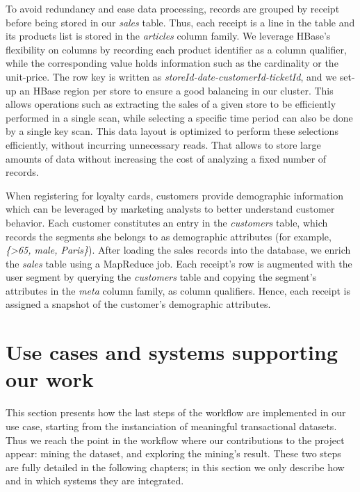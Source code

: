 To avoid redundancy and ease data processing,
records are grouped by receipt before being stored in our \textit{sales} table.
Thus, each receipt is a line in the table
and its products list is stored in the \textit{articles} column family.
We leverage HBase's flexibility on columns by recording each product identifier as a column qualifier,
while the corresponding value holds information such as the cardinality or the unit-price.
The row key is written as \textit{storeId-date-customerId-ticketId},
and we set-up an HBase region per store to ensure a good balancing in our cluster.
This allows operations such as extracting the sales of a given store
to be efficiently performed in a single scan,
while selecting a specific time period can also be done by a single key scan.
This data layout is optimized to perform these selections efficiently,
without incurring unnecessary reads.
That allows to store large amounts of data without increasing the cost of analyzing a fixed
number of records.

When registering for loyalty cards,
customers provide demographic information which can be leveraged by marketing analysts
to better understand customer behavior.
Each customer constitutes an entry in the \textit{customers} table,
which records the segments she belongs to as demographic attributes
(for example, {\em \{>65, male, Paris\}}).
After loading the sales records into the database,
we enrich the \textit{sales} table using a MapReduce job.
Each receipt's row is augmented with the user segment by querying the
\textit{customers} table and copying the segment's attributes
in the \textit{meta} column family, as column qualifiers.
Hence, each receipt is assigned a snapshot of the customer's demographic attributes.




\section{Use cases and systems supporting our work}
\label{sec:pipeline:ours}

This section presents how the last steps of the \datalyse workflow are implemented in our use case,
starting from the instanciation of meaningful transactional datasets.
Thus we reach the point in the workflow where our contributions to the project appear:
mining the dataset, and exploring the mining's result.
These two steps are fully detailed in the following chapters;
in this section we only describe how and in which systems they are integrated.

